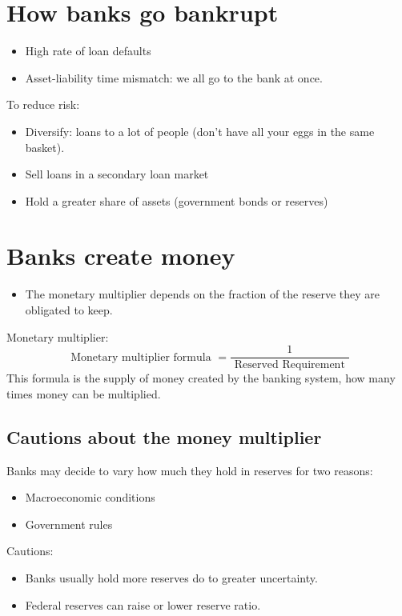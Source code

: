 \documentclass[openany]{book}
\begin{document}
\section{How banks go bankrupt}
\begin{itemize}
    \item High rate of loan defaults 
    \item Asset-liability time mismatch: we all go to the bank at once.
\end{itemize}
To reduce risk: 
\begin{itemize}
    \item Diversify: loans to a lot of people (don't have all your eggs in the same basket).
    \item Sell loans in a secondary loan market 
    \item Hold a greater share of assets (government bonds or reserves)
\end{itemize}

\section{Banks create money}
\begin{itemize}
    \item The monetary multiplier depends on the fraction of the reserve they are obligated to keep.
\end{itemize}
Monetary multiplier: 
\[
  \text{ Monetary multiplier formula } = \frac{1}{\text{ Reserved Requirement }} 
\]
This formula is the supply of money created by the banking system, how many times money can be multiplied.

\subsection{Cautions about the money multiplier}
Banks may decide to vary how much they hold in reserves for two reasons: 
\begin{itemize}
    \item Macroeconomic conditions 
    \item Government rules 
\end{itemize}
Cautions:
\begin{itemize}
    \item Banks usually hold more reserves do to greater uncertainty. 
    \item Federal reserves can raise or lower reserve ratio. 
\end{itemize}
\end{document}
